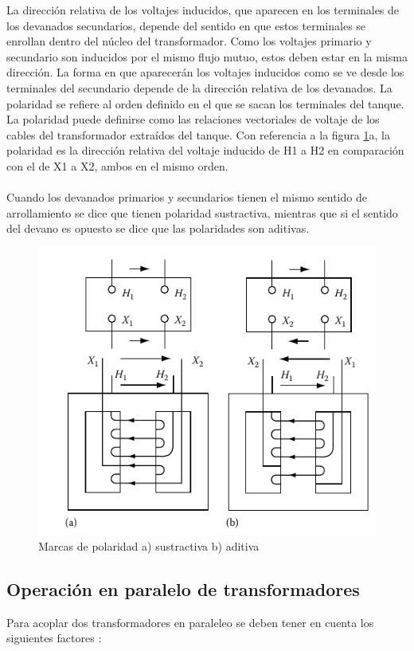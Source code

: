 \documentclass[a5paper]{book}%
\begin{document}
La dirección relativa de los voltajes inducidos, que aparecen en los terminales de los devanados secundarios, depende del sentido en que estos terminales se enrollan dentro del núcleo  del transformador. Como los voltajes primario y secundario son inducidos por el mismo flujo mutuo, estos deben estar en la misma dirección. La forma en que aparecerán los voltajes inducidos como se ve desde los terminales del secundario depende de la dirección relativa de los devanados. La polaridad se refiere al orden definido en el que se sacan los terminales del tanque. La polaridad puede definirse como las relaciones vectoriales de voltaje de los cables del transformador extraídos del tanque. Con referencia a la figura \ref{fig:polaridadtransformadores}a, la polaridad es la dirección relativa del voltaje inducido de H1 a H2 en comparación con el de X1 a X2, ambos en el mismo orden.  \cite{POWERSADAS2012}\\\\
Cuando los devanados primarios y secundarios tienen el mismo sentido de arrollamiento se dice que tienen polaridad sustractiva, mientras que si el sentido del devano es opuesto se dice que las polaridades son aditivas.

\begin{figure}[H]
	\centering	\includegraphics[width=0.7\linewidth]{polaridad_transformadores}
	\caption{Marcas de polaridad a) sustractiva b) aditiva}
	\label{fig:polaridadtransformadores}
\end{figure}

\subsection{Operación en paralelo de transformadores}

Para acoplar dos transformadores en paraleleo se deben tener en cuenta
los siguientes factores \cite{POWERSADAS2012}:
\end{document}
